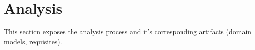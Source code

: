 
\section{Analysis}

This section exposes the analysis process and it's corresponding artifacts (domain models, requisites).  



